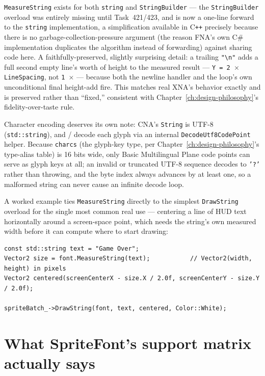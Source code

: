 \texttt{MeasureString} exists for both \texttt{string} and \texttt{StringBuilder} --- the
\texttt{StringBuilder} overload was entirely missing until Task~421/423, and is now a
one-line forward to the \texttt{string} implementation, a simplification available in
C\texttt{++} precisely because there is no garbage-collection-pressure argument (the reason
FNA's own C\# implementation duplicates the algorithm instead of forwarding) against sharing
code here. A faithfully-preserved, slightly surprising detail: a trailing \texttt{"\textbackslash n"}
adds a full second empty line's worth of height to the measured result ---
\texttt{Y = 2 \(\times\) LineSpacing}, not \texttt{1 \(\times\)} --- because both the newline
handler and the loop's own unconditional final height-add fire. This matches real XNA's
behavior exactly and is preserved rather than ``fixed,'' consistent with
Chapter~\ref{ch:design-philosophy}'s fidelity-over-taste rule.

Character encoding deserves its own note: CNA's \texttt{String} is UTF-8
(\texttt{std::string}), and  /  decode each glyph via
an internal \texttt{DecodeUtf8CodePoint} helper. Because \texttt{charcs} (the glyph-key type,
per Chapter~\ref{ch:design-philosophy}'s type-alias table) is 16 bits wide, only Basic
Multilingual Plane code points can serve as glyph keys at all; an invalid or truncated UTF-8
sequence decodes to \texttt{'?'} rather than throwing, and the byte index always advances by
at least one, so a malformed string can never cause an infinite decode loop.

A worked example ties \texttt{MeasureString} directly to the simplest \texttt{DrawString}
overload for the single most common real use --- centering a line of HUD text horizontally
around a screen-space point, which needs the string's own measured width before it can compute
where to start drawing:

\begin{lstlisting}
const std::string text = "Game Over";
Vector2 size = font.MeasureString(text);           // Vector2(width, height) in pixels
Vector2 centered(screenCenterX - size.X / 2.0f, screenCenterY - size.Y / 2.0f);

spriteBatch_->DrawString(font, text, centered, Color::White);
\end{lstlisting}

\section{What SpriteFont's support matrix actually says}

